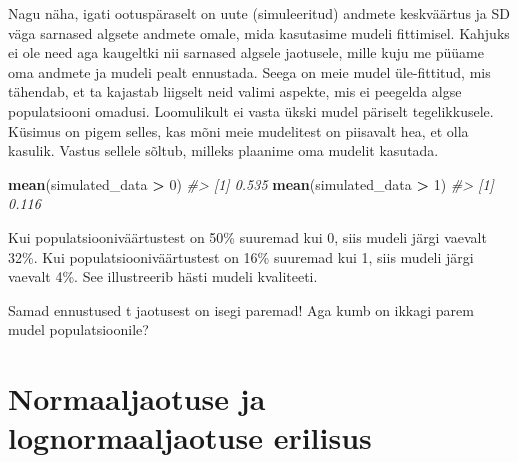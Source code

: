 \documentclass[]{book}
\newenvironment{Shaded}{\begin{snugshade}}{\end{snugshade}}
\newcommand{\KeywordTok}[1]{\textcolor[rgb]{0.13,0.29,0.53}{\textbf{#1}}}
\newcommand{\DecValTok}[1]{\textcolor[rgb]{0.00,0.00,0.81}{#1}}
\newcommand{\StringTok}[1]{\textcolor[rgb]{0.31,0.60,0.02}{#1}}
\newcommand{\CommentTok}[1]{\textcolor[rgb]{0.56,0.35,0.01}{\textit{#1}}}
\newcommand{\OperatorTok}[1]{\textcolor[rgb]{0.81,0.36,0.00}{\textbf{#1}}}
\newcommand{\NormalTok}[1]{#1}
\begin{document}
Nagu näha, igati ootuspäraselt on uute (simuleeritud) andmete
keskväärtus ja SD väga sarnased algsete andmete omale, mida kasutasime
mudeli fittimisel. Kahjuks ei ole need aga kaugeltki nii sarnased
algsele jaotusele, mille kuju me püüame oma andmete ja mudeli pealt
ennustada. Seega on meie mudel üle-fittitud, mis tähendab, et ta
kajastab liigselt neid valimi aspekte, mis ei peegelda algse
populatsiooni omadusi. Loomulikult ei vasta ükski mudel päriselt
tegelikkusele. Küsimus on pigem selles, kas mõni meie mudelitest on
piisavalt hea, et olla kasulik. Vastus sellele sõltub, milleks plaanime
oma mudelit kasutada.

\begin{Shaded}
\begin{Highlighting}[]
\KeywordTok{mean}\NormalTok{(simulated_data }\OperatorTok{>}\StringTok{ }\DecValTok{0}\NormalTok{) }
\CommentTok{#> [1] 0.535}
\KeywordTok{mean}\NormalTok{(simulated_data }\OperatorTok{>}\StringTok{ }\DecValTok{1}\NormalTok{)}
\CommentTok{#> [1] 0.116}
\end{Highlighting}
\end{Shaded}

Kui populatsiooniväärtustest on 50\% suuremad kui 0, siis mudeli järgi
vaevalt 32\%. Kui populatsiooniväärtustest on 16\% suuremad kui 1, siis
mudeli järgi vaevalt 4\%. See illustreerib hästi mudeli kvaliteeti.

\begin{Shaded}
\end{Shaded}

Samad ennustused t jaotusest on isegi paremad! Aga kumb on ikkagi parem
mudel populatsioonile?

\section*{Normaaljaotuse ja lognormaaljaotuse
erilisus}\label{normaaljaotuse-ja-lognormaaljaotuse-erilisus}
\end{document}
